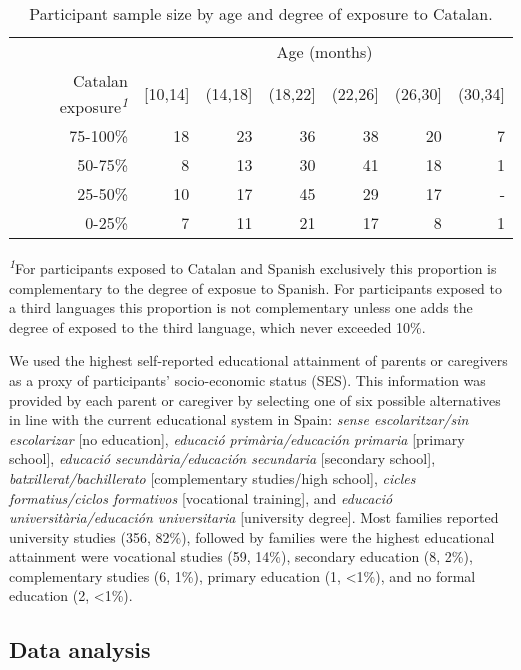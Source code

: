 \documentclass[
]{article}
\begin{document}
\hypertarget{tbl-participants}{}
\setlength{\LTpost}{0mm}
\begin{longtable}{rrrrrrr}
\caption{\label{tbl-participants}Participant sample size by age and degree of exposure to Catalan. }\tabularnewline

\toprule
 & \multicolumn{6}{c}{Age (months)} \\ 
\cmidrule(lr){2-7}
Catalan exposure\textsuperscript{\textit{1}} & [10,14] & (14,18] & (18,22] & (22,26] & (26,30] & (30,34] \\ 
\midrule
75-100\% & 18 & 23 & 36 & 38 & 20 & 7 \\ 
50-75\% & 8 & 13 & 30 & 41 & 18 & 1 \\ 
25-50\% & 10 & 17 & 45 & 29 & 17 & - \\ 
0-25\% & 7 & 11 & 21 & 17 & 8 & 1 \\ 
\bottomrule
\end{longtable}
\begin{minipage}{\linewidth}
\textsuperscript{\textit{1}}For participants exposed to Catalan and Spanish exclusively this proportion is complementary to the degree of exposue to Spanish. For participants exposed to a third languages this proportion is not complementary unless one adds the degree of exposed to the third language, which never exceeded 10\%.\\
\end{minipage}

We used the highest self-reported educational attainment of parents or
caregivers as a proxy of participants' socio-economic status (SES). This
information was provided by each parent or caregiver by selecting one of
six possible alternatives in line with the current educational system in
Spain: \emph{sense escolaritzar/sin escolarizar} {[}no education{]},
\emph{educació primària/educación primaria} {[}primary school{]},
\emph{educació secundària/educación secundaria} {[}secondary school{]},
\emph{batxillerat/bachillerato} {[}complementary studies/high school{]},
\emph{cicles formatius/ciclos formativos} {[}vocational training{]}, and
\emph{educació universitària/educación universitaria} {[}university
degree{]}. Most families reported university studies (356, 82\%),
followed by families were the highest educational attainment were
vocational studies (59, 14\%), secondary education (8, 2\%),
complementary studies (6, 1\%), primary education (1, \textless1\%), and
no formal education (2, \textless1\%).

\hypertarget{sec-analysis}{%
\subsection{Data analysis}\label{sec-analysis}}
\end{document}

